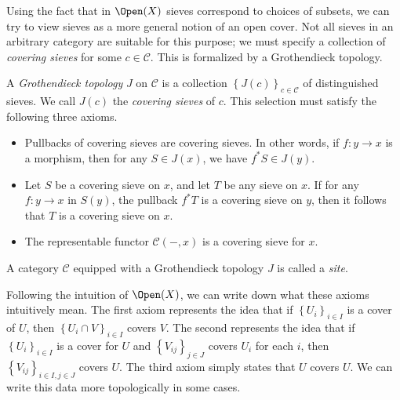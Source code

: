 Using the fact that in $\Open(X) $ sieves correspond to choices of subsets, we can try to view sieves as a more general notion of an open cover. Not all sieves in an arbitrary category are suitable for this purpose; we must specify a collection of \emph{covering sieves} for some $c\in \mathcal{C} $. This is formalized by a Grothendieck topology.
\begin{definition}\label{dfn:3-5-2}
	A \emph{Grothendieck topology} $J$ on $\mathcal{C} $ is a collection $\left\{ J(c) \right\}_{c\in \mathcal{C} } $ of distinguished sieves. We call $J(c)$ the \emph{covering sieves} of $c$. This selection must satisfy the following three axioms.
	\begin{itemize}
		\item Pullbacks of covering sieves are covering sieves. In other words, if $f : y \to x$ is a morphism, then for any $S\in J(x)$, we have $f^*S\in J(y)$.
		\item Let $S$ be a covering sieve on $x$, and let $T$ be any sieve on $x$. If for any $f : y \to x$ in $S(y)$, the pullback $f^*T$ is a covering sieve on $y$, then it follows that $T$ is a covering sieve on $x$.
		\item The representable functor $\mathcal{C} (-,x)$ is a covering sieve for $x$.
	\end{itemize}
	A category $\mathcal{C} $ equipped with a Grothendieck topology $J$ is called a \emph{site}.
\end{definition}

Following the intuition of $\Open(X) $, we can write down what these axioms intuitively mean. The first axiom represents the idea that if $\left\{ U_i \right\}_{i\in I}$ is a cover of $U$, then $\left\{ U_i \cap V \right\} _{i\in I}$ covers $V$. The second represents the idea that if $\left\{ U_i \right\} _{i\in I} $ is a cover for $U$ and $\left\{ V_{ij}\right\} _{j\in J} $ covers $U_i$ for each $i$, then $\left\{ V_{ij}  \right\} _{i\in I,j\in J} $ covers $U$. The third axiom simply states that $U$ covers $U$. We can write this data more topologically in some cases.

